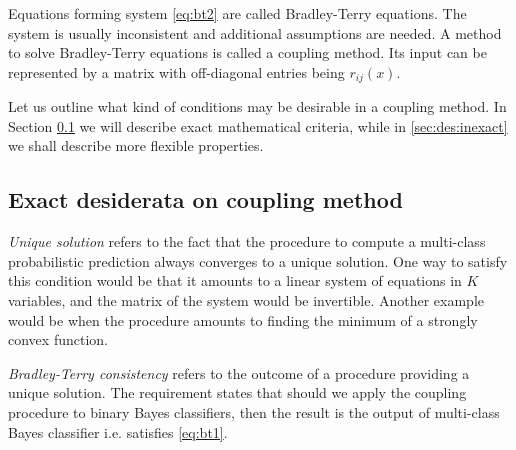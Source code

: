 \documentclass[twoside,11pt]{article}
\begin{document}
Equations forming system \eqref{eq:bt2} are called Bradley-Terry equations.
The system is usually inconsistent and additional assumptions are needed. A method to solve Bradley-Terry equations is called a coupling method. Its input can be represented by a matrix with off-diagonal entries being $r_{ij}(x)$.

Let us outline what kind of conditions may be desirable in a coupling method. In Section \ref{sec:des:exact} we will describe exact mathematical criteria, while in \ref{sec:des:inexact} we shall describe more flexible properties.


\subsection{Exact desiderata on coupling method} \label{sec:des:exact}

%



\emph{Unique solution} refers to the fact that the procedure to compute a multi-class probabilistic prediction always converges to a unique solution. One way to satisfy this condition would be that it amounts to a linear system of equations in $K$ variables, and the matrix of the system would be invertible. Another example would be when the procedure amounts to finding the minimum of a strongly convex function. 

\emph{Bradley-Terry consistency} refers to the outcome of a procedure providing a unique solution. The requirement states that should we apply the coupling procedure to binary Bayes classifiers, then the result is the output of multi-class Bayes classifier i.e. satisfies \eqref{eq:bt1}.
\end{document}
